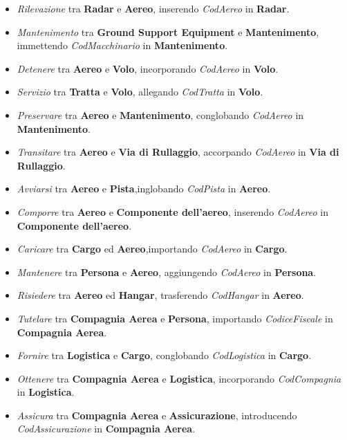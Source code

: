 \begin{itemize}
	\item \textsf{\small \emph{Rilevazione} tra \textbf{Radar} e \textbf{Aereo}, inserendo \emph{CodAereo} in \textbf{Radar}.}
	\item \textsf{\small \emph{Mantenimento} tra \textbf{Ground Support Equipment} e \textbf{Mantenimento}, immettendo \emph{CodMacchinario} in \textbf{Mantenimento}.}
	\item \textsf{\small \emph{Detenere} tra \textbf{Aereo} e \textbf{Volo}, incorporando \emph{CodAereo} in \textbf{Volo}.}
	\item \textsf{\small \emph{Servizio} tra \textbf{Tratta} e \textbf{Volo}, allegando \emph{CodTratta} in \textbf{Volo}.}
	\item \textsf{\small \emph{Preservare} tra \textbf{Aereo} e \textbf{Mantenimento}, conglobando \emph{CodAereo} in \textbf{Mantenimento}.}
	\item \textsf{\small \emph{Transitare} tra \textbf{Aereo} e \textbf{Via di Rullaggio}, accorpando \emph{CodAereo} in \textbf{Via di Rullaggio}.}
	\item \textsf{\small \emph{Avviarsi} tra \textbf{Aereo} e \textbf{Pista},inglobando \emph{CodPista} in \textbf{Aereo}.}
	\item \textsf{\small \emph{Comporre} tra \textbf{Aereo} e \textbf{Componente dell'aereo}, inserendo \emph{CodAereo} in \textbf{Componente dell'aereo}.} %
	\item \textsf{\small \emph{Caricare} tra \textbf{Cargo} ed \textbf{Aereo},importando \emph{CodAereo} in \textbf{Cargo}.}
	\item \textsf{\small \emph{Mantenere} tra \textbf{Persona} e \textbf{Aereo}, aggiungendo \emph{CodAereo} in \textbf{Persona}.}
	\item \textsf{\small \emph{Risiedere} tra \textbf{Aereo} ed \textbf{Hangar}, trasferendo \emph{CodHangar} in \textbf{Aereo}.}
	\item \textsf{\small \emph{Tutelare} tra \textbf{Compagnia Aerea} e \textbf{Persona}, importando \emph{CodiceFiscale} in \textbf{Compagnia Aerea}.}
	\item \textsf{\small \emph{Fornire} tra \textbf{Logistica} e \textbf{Cargo}, conglobando \emph{CodLogistica} in \textbf{Cargo}.}
	\item \textsf{\small \emph{Ottenere} tra \textbf{Compagnia Aerea} e \textbf{Logistica}, incorporando \emph{CodCompagnia} in \textbf{Logistica}.}
	\item \textsf{\small \emph{Assicura} tra \textbf{Compagnia Aerea} e \textbf{Assicurazione}, introducendo \emph{CodAssicurazione} in \textbf{Compagnia Aerea}.}
\end{itemize}

